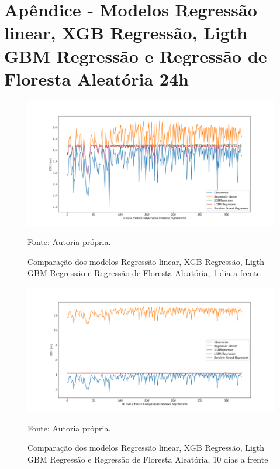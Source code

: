 
\section{Apêndice - Modelos Regressão linear, XGB Regressão, Ligth GBM Regressão e Regressão de Floresta Aleatória 24h}\label{sec:lrxgblgbmrf24}

\begin{figure}[H]
	\centering
	\caption{Comparação dos modelos Regressão linear, XGB Regressão, Ligth GBM Regressão e Regressão de Floresta Aleatória, 1 dia a frente }
	\label{fig:1-LR-XGB-LGBM-RF24}
	\includegraphics[width=1\linewidth]{Apendices/Figuras/modelagem-24h/1-LR-XGB-LGBM-RF}
	
	Fonte: Autoria própria.
\end{figure}

\begin{figure}[H]
	\centering
	\caption{Comparação dos modelos Regressão linear, XGB Regressão, Ligth GBM Regressão e Regressão de Floresta Aleatória, 10 dias a frente }
	\label{fig:10-LR-XGB-LGBM-RF24}
	\includegraphics[width=1\linewidth]{Apendices/Figuras/modelagem-24h/10-LR-XGB-LGBM-RF}
	
	Fonte: Autoria própria.
\end{figure}


